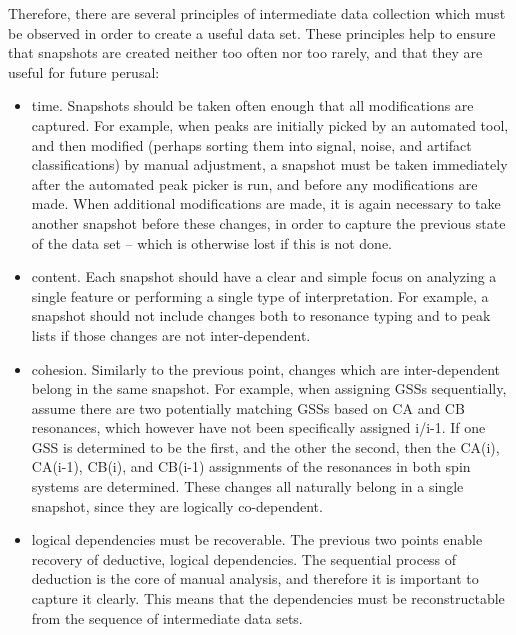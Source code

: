Therefore, there are several principles of intermediate data collection which
must be observed in order to create a useful data set.  These principles help
to ensure that snapshots are created neither too often nor too rarely, and
that they are useful for future perusal:
\begin{itemize}
  \item time.
    Snapshots should be taken often enough that all modifications are captured.
    For example, when peaks are initially picked by an automated tool, and then 
    modified (perhaps sorting them into signal, noise, and artifact classifications)
    by manual adjustment, a snapshot must be taken immediately after the automated
    peak picker is run, and before any modifications are made.  When additional
    modifications are made, it is again necessary to take another snapshot before
    these changes, in order to capture the previous state of the data set -- which
    is otherwise lost if this is not done.
  \item content.
    Each snapshot should have a clear and simple focus on analyzing a single
    feature or performing a single type of interpretation.  For example, a snapshot
    should not include changes both to resonance typing and to peak lists if those
    changes are not inter-dependent.  
  \item cohesion.
    Similarly to the previous point, changes which are inter-dependent belong in
    the same snapshot.  For example, when assigning GSSs sequentially, assume there
    are two potentially matching GSSs based on CA and CB resonances, which however
    have not been specifically assigned i/i-1.  If one GSS is determined to be the
    first, and the other the second, then the CA(i), CA(i-1), CB(i), and CB(i-1)
    assignments of the resonances in both spin systems are determined.  These 
    changes all naturally belong in a single snapshot, since they are logically 
    co-dependent.
  \item logical dependencies must be recoverable.
    The previous two points enable recovery of deductive, logical dependencies.  
    The sequential process of deduction is the core of manual analysis, and 
    therefore it is important to capture it clearly.  This means that the 
    dependencies must be reconstructable from the sequence of intermediate data 
    sets.
\end{itemize}

